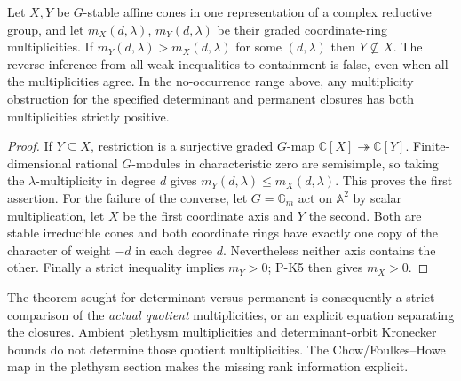 \begin{proposition}
\label{prop:multiplicity}
Let $X,Y$ be $G$-stable affine cones in one representation of a complex
reductive group, and let $m_X(d,\lambda)$, $m_Y(d,\lambda)$ be their
graded coordinate-ring multiplicities. If
$m_Y(d,\lambda)>m_X(d,\lambda)$ for some $(d,\lambda)$ then
$Y\not\subseteq X$. The reverse inference from all weak inequalities
to containment is false, even when all the multiplicities agree.
In the no-occurrence range above, any multiplicity obstruction for the
specified determinant and permanent closures has both multiplicities
strictly positive.
\end{proposition}
\begin{proof}
If $Y\subseteq X$, restriction is a surjective graded $G$-map
$\mathbb C[X]\twoheadrightarrow\mathbb C[Y]$.
Finite-dimensional rational $G$-modules in characteristic zero are
semisimple, so taking the $\lambda$-multiplicity in degree $d$ gives
$m_Y(d,\lambda)\le m_X(d,\lambda)$. This proves the first assertion.
For the failure of the converse, let $G=\mathbb G_m$ act on
$\mathbb A^2$ by scalar multiplication, let $X$ be the first coordinate
axis and $Y$ the second. Both are stable irreducible cones and both
coordinate rings have exactly one copy of the character of weight
$-d$ in each degree $d$. Nevertheless neither axis contains the other.
Finally a strict inequality implies $m_Y>0$; P-K5 then gives $m_X>0$.
\end{proof}

The theorem sought for determinant versus permanent is consequently
a strict comparison of the \emph{actual quotient} multiplicities, or
an explicit equation separating the closures. Ambient plethysm
multiplicities and determinant-orbit Kronecker bounds do not determine
those quotient multiplicities. The Chow/Foulkes--Howe map in the
plethysm section makes the missing rank information explicit.

